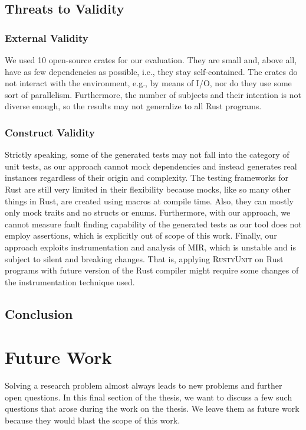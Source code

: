 \documentclass[paper=a4,%
  twoside,%
  BCOR4mm,%
  abstract=true,%
  toc=bibliography,%
  chapterprefix=true,%
  toc=bibliographynumbered,%
  open=right,%
  english,%
  pagesize=pdftex]{scrreprt}
\newcommand{\benchnum}{10\xspace}
\newcommand{\tech}{\textsc{RustyUnit}\xspace}
\newcommand{\mir}{\ac{MIR}\xspace}
\begin{document}
\section{Threats to Validity}
\label{sec:threats-to-validity}

\subsection*{External Validity}
We used \benchnum open-source crates for our evaluation. They are small and, above all, have as few dependencies as possible, i.e., they stay self-contained. The crates do not interact with the environment, e.g., by means of I/O, nor do they use some sort of parallelism. Furthermore, the number of subjects and their intention is not diverse enough, so the results may not generalize to all Rust programs.

\subsection*{Construct Validity}
Strictly speaking, some of the generated tests may not fall into the category of unit tests, as our approach cannot mock dependencies and instead generates real instances regardless of their origin and complexity. The testing frameworks for Rust are still very limited in their flexibility because mocks, like so many other things in Rust, are created using macros at compile time. Also, they can mostly only mock traits and no structs or enums. Furthermore, with our approach, we cannot measure fault finding capability of the generated tests as our tool does not employ assertions, which is explicitly out of scope of this work. Finally, our approach exploits instrumentation and analysis of \mir, which is unstable and is subject to silent and breaking changes. That is, applying \tech on Rust programs with future version of the Rust compiler might require some changes of the instrumentation technique used.

\section{Conclusion}
\label{sec:discussion}



\clearpage
\chapter{Future Work}
\label{chap:future-work}
Solving a research problem almost always leads to new problems and further open questions. In this final section of the thesis, we want to discuss a few such questions that arose during the work on the thesis. We leave them as future work because they would blast the scope of this work. 
\end{document}

